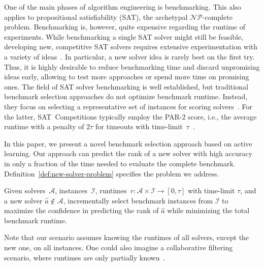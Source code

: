 \documentclass[runningheads]{llncs}
\begin{document}
One of the main phases of algorithm engineering is benchmarking.
This also applies to propositional satisfiability (SAT), the archetypal $\mathcal{NP}$-complete problem.
Benchmarking is, however, quite expensive regarding the runtime of experiments.
While benchmarking a single SAT solver might still be feasible, developing new, competitive SAT solvers requires extensive experimentation with a variety of ideas~\cite{FroleyksHIJS21,sat2022}.
In particular, a new solver idea is rarely best on the first try.
Thus, it is highly desirable to reduce benchmarking time and discard unpromising ideas early, allowing to test more approaches or spend more time on promising ones.
The field of SAT solver benchmarking is well established, but traditional benchmark selection approaches do not optimize benchmark runtime.
Instead, they focus on selecting a representative set of instances for scoring solvers~\cite{Gelder11,HoosKSS13}.
For the latter, SAT~Competitions typically employ the \mbox{PAR-2} score, i.e., the average runtime with a penalty of $2 \tau$ for timeouts with time-limit~$\tau$~\cite{FroleyksHIJS21}.

In this paper, we present a novel benchmark selection approach based on active learning.
Our approach can predict the rank of a new solver with high accuracy in only a fraction of the time needed to evaluate the complete benchmark.
Definition~\ref{def:new-solver-problem} specifies the problem we address.

\begin{definition}
  Given solvers~$\mathcal{A}$, instances~$\mathcal{I}$, runtimes~$r\!: \mathcal{A} \times \mathcal{I} \rightarrow \left[0, \tau\right]$ with time-limit $\tau$, and a new solver $\hat{a} \notin \mathcal{A}$, incrementally select benchmark instances from $\mathcal{I}$ to maximize the confidence in predicting the rank of $\hat{a}$ while minimizing the total benchmark runtime.
  \label{def:new-solver-problem}
\end{definition}

Note that our scenario assumes knowing the runtimes of all solvers, except the new one, on all instances.
One could also imagine a collaborative filtering scenario, where runtimes are only partially known~\cite{misir2017data,misir2017alors}.
\end{document}
